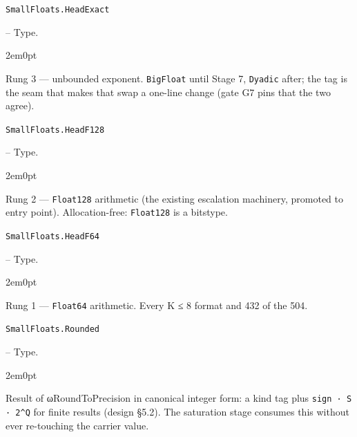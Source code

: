 \par\medskip\noindent\begin{minipage}{\linewidth}
\hypertarget{12343000088784592265}{\texttt{SmallFloats.HeadExact}}  -- {Type.}
\nopagebreak
\begin{adjustwidth}{2em}{0pt}

Rung 3 — unbounded exponent. \texttt{BigFloat} until Stage 7, \texttt{Dyadic} after; the tag is the seam that makes that swap a one-line change (gate G7 pins that the two agree).



\end{adjustwidth}
\end{minipage}
\par\medskip

\par\medskip\noindent\begin{minipage}{\linewidth}
\hypertarget{3528180919873185467}{\texttt{SmallFloats.HeadF128}}  -- {Type.}
\nopagebreak
\begin{adjustwidth}{2em}{0pt}

Rung 2 — \texttt{Float128} arithmetic (the existing escalation machinery, promoted to entry point). Allocation-free: \texttt{Float128} is a bitstype.



\end{adjustwidth}
\end{minipage}
\par\medskip

\par\medskip\noindent\begin{minipage}{\linewidth}
\hypertarget{9123640062122562911}{\texttt{SmallFloats.HeadF64}}  -- {Type.}
\nopagebreak
\begin{adjustwidth}{2em}{0pt}

Rung 1 — \texttt{Float64} arithmetic. Every K ≤ 8 format and 432 of the 504.



\end{adjustwidth}
\end{minipage}
\par\medskip

\par\medskip\noindent\begin{minipage}{\linewidth}
\hypertarget{3305030421944754103}{\texttt{SmallFloats.Rounded}}  -- {Type.}
\nopagebreak
\begin{adjustwidth}{2em}{0pt}

Result of ωRoundToPrecision in canonical integer form: a kind tag plus \texttt{sign · S · 2{\textasciicircum}Q} for finite results (design §5.2). The saturation stage consumes this without ever re-touching the carrier value.



\end{adjustwidth}
\end{minipage}
\par\medskip

